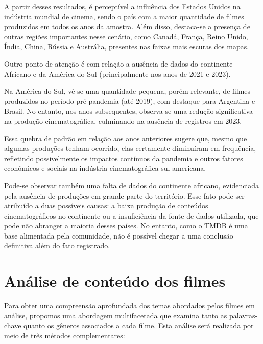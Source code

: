 %

%

%

A partir desses resultados, é perceptível a influência dos Estados Unidos na indústria mundial de cinema, sendo o país com a maior quantidade de filmes produzidos em todos os anos da amostra. Além disso, destaca-se a presença de outras regiões importantes nesse cenário, como Canadá, França, Reino Unido, Índia, China, Rússia e Austrália, presentes nas faixas mais escuras dos mapas.

Outro ponto de atenção é com relação a ausência de dados do continente Africano e da América do Sul (principalmente nos anos de 2021 e 2023).   

Na América do Sul, vê-se uma quantidade pequena, porém relevante, de filmes produzidos no período pré-pandemia (até 2019), com destaque para Argentina e Brasil. No entanto, nos anos subsequentes, observa-se uma redução significativa na produção cinematográfica, culminando na ausência de registros em 2023.

Essa quebra de padrão em relação aos anos anteriores sugere que, mesmo que algumas produções tenham ocorrido, elas certamente diminuíram em frequência, refletindo possivelmente os impactos contínuos da pandemia e outros fatores econômicos e sociais na indústria cinematográfica sul-americana.

Pode-se observar também uma falta de dados do continente africano, evidenciada pela ausência de produções em grande parte do território. Esse fato pode ser atribuído a duas possíveis causas: a baixa produção de conteúdos cinematográficos no continente ou a insuficiência da fonte de dados utilizada, que pode não abranger a maioria desses países. No entanto, como o \acrshort{TMDB} é uma base alimentada pela comunidade, não é possível chegar a uma conclusão definitiva além do fato registrado.


\section{Análise de conteúdo dos filmes}
Para obter uma compreensão aprofundada dos temas abordados pelos filmes em análise, propomos uma abordagem multifacetada que examina tanto as palavras-chave quanto os gêneros associados a cada filme. Esta análise será realizada por meio de três métodos complementares:

